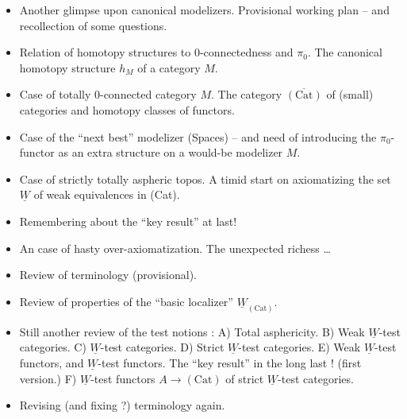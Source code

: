 \documentclass[11pt,a4paper]{article}
\begin{document}
\begin{itemize}
  \item[56.] Another glimpse upon canonical modelizers. Provisional working plan -- and recollection of some questions.
  \item[57.] Relation of homotopy structures to 0-connectedness and $\pi_{0}$. The canonical homotopy structure $h_{M}$ of a category $M$.
  \item[58.] Case of totally 0-connected category $M$. The category $\overline{(\mathrm{Cat})}$ of (small) categories and homotopy classes of functors.
  \item[59.] Case of the ``next best'' modelizer (Spaces) -- and need of introducing the $\pi_{0}$-functor as an extra structure on a would-be modelizer $M$.
  \item[60.] Case of  strictly totally aspheric topos. A timid start on axiomatizing the set $\underline{W}$ of weak equivalences in (Cat).
  \item[61.] Remembering about the  ``key result'' at last!
  \item[(62.)] An  case of hasty over-axiomatization. The unexpected richess …
  \item[63.] Review of terminology (provisional).
  \item[64.] Review of properties of the ``basic localizer'' $\underline{W}_{(\mathrm{Cat})}$.
  \item[65.] Still another review of the test notions :
  A) Total asphericity.
  B) Weak $\underline{W}$-test categories.
  C) $\underline{W}$-test categories.
  D) Strict $\underline{W}$-test categories.
  E) Weak $\underline{W}$-test functors, and $\underline{W}$-test functors. The ``key result'' in the long last ! (first version.) 
  F) $\underline{W}$-test functors $A\to(\mathrm{Cat})$ of strict $\underline{W}$-test categories.
  \item[66.] Revising (and fixing ?) terminology again.
\end{itemize}
\end{document}
